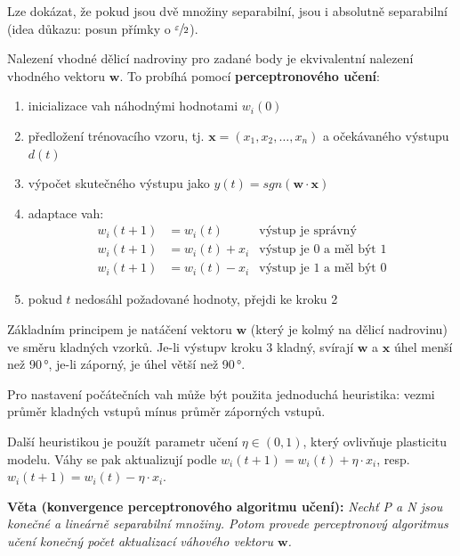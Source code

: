 \documentclass[11pt]{report} %
\renewcommand{\vec}[1]{\mathbf{#1}}
\begin{document}
Lze dokázat, že pokud jsou dvě množiny separabilní, jsou i absolutně separabilní (idea důkazu: posun přímky o $\sfrac{\varepsilon}{2}$).

Nalezení vhodné dělicí nadroviny pro zadané body je ekvivalentní nalezení vhodného vektoru $\vec{w}$. To probíhá pomocí \textbf{perceptronového učení}:
\begin{enumerate}
	\leftskip 40pt
	\setlength{\itemsep}{0pt}
	\item inicializace vah náhodnými hodnotami $w_i(0)$
	\item předložení trénovacího vzoru, tj. $\vec{x} = (x_1, x_2,\dots,x_n)$ a očekávaného výstupu $d(t)$
	\item výpočet skutečného výstupu jako $y(t) = sgn(\vec{w}\cdot\vec{x})$
	\item adaptace vah:
	\begin{align*}
		w_i(t+1)& = w_i(t)			& \text{výstup je správný}\\
		w_i(t+1)& = w_i(t) + x_i	& \text{výstup je 0 a měl být 1}\\
		w_i(t+1)& = w_i(t) - x_i	& \text{výstup je 1 a měl být 0}
	\end{align*}
	\item pokud $t$ nedosáhl požadované hodnoty, přejdi ke kroku 2
\end{enumerate}

Základním principem je natáčení vektoru $\vec{w}$ (který je kolmý na dělicí nadrovinu) ve směru kladných vzorků. Je-li výstupv kroku 3 kladný, svírají $\vec{w}$ a $\vec{x}$ úhel menší než 90\,°, je-li záporný, je úhel větší než 90\,°. 

Pro nastavení počátečních vah může být použita jednoduchá heuristika: vezmi průměr kladných vstupů mínus průměr záporných vstupů.

Další heuristikou je použít parametr učení $\eta \in (0,1)$, který ovlivňuje plasticitu modelu. Váhy se pak aktualizují podle $w_i(t+1) = w_i(t) + \eta\cdot x_i$, resp. $w_i(t+1) = w_i(t) - \eta\cdot x_i$.

\medskip\noindent\textbf{Věta (konvergence perceptronového algoritmu učení):} \textit{Nechť P a N jsou konečné a lineárně separabilní množiny. Potom provede perceptronový algoritmus učení konečný počet aktualizací váhového vektoru $\vec{w}$.}
\end{document}
